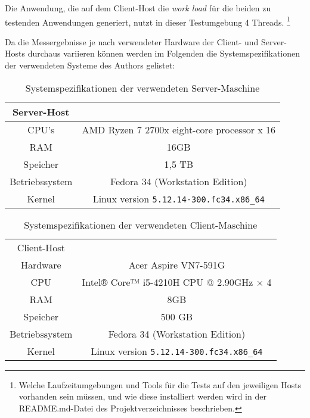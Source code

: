 Die Anwendung, die auf dem Client-Host die \textit{work load} für die beiden zu testenden Anwendungen generiert,
nutzt in dieser Testumgebung 4 Threads.
\footnote{Welche Laufzeitumgebungen und Tools für die Tests auf den jeweiligen Hosts vorhanden sein müssen, und wie diese installiert werden
  wird in der README.md-Datei des Projektverzeichnisses beschrieben.}

Da die Messergebnisse je nach verwendeter Hardware der Client- und Server-Hosts durchaus variieren können werden im Folgenden
die Systemspezifikationen der verwendeten Systeme des Authors gelistet:
\begin{table}[ht!]
  \centering
  \begin{tabular}{| c | c |}
    \hline
    Server-Host                                                  \\
    \hline
    CPU's          & AMD Ryzen 7 2700x eight-core processor x 16 \\
    \hline
    RAM            & 16GB                                        \\
    \hline
    Speicher       & 1,5 TB                                      \\
    \hline
    Betriebssystem & Fedora 34 (Workstation Edition)             \\
    \hline
    Kernel         & Linux version \verb|5.12.14-300.fc34.x86_64|   \\
    \hline
  \end{tabular}
  \caption{Systemspezifikationen der verwendeten Server-Maschine}
  \label{table:system_host}
\end{table}

\begin{table}[ht!]
  \centering
  \begin{tabular}{| c | c |}
    \hline
    Client-Host                                                \\
    Hardware       & Acer Aspire VN7-591G                      \\
    \hline
    CPU            & Intel® Core™ i5-4210H CPU @ 2.90GHz × 4   \\
    \hline
    RAM            & 8GB                                       \\
    \hline
    Speicher       & 500 GB                                    \\
    \hline
    Betriebssystem & Fedora 34 (Workstation Edition)           \\
    \hline
    Kernel         & Linux version \verb|5.12.14-300.fc34.x86_64| \\
    \hline
  \end{tabular}
  \caption{Systemspezifikationen der verwendeten Client-Maschine}
  \label{table:system_client}
\end{table}

